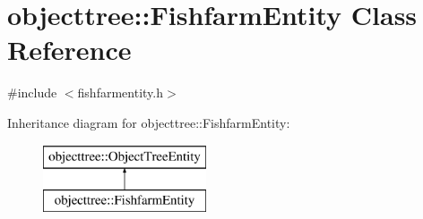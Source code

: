 \hypertarget{classobjecttree_1_1_fishfarm_entity}{}\section{objecttree\+::Fishfarm\+Entity Class Reference}
\label{classobjecttree_1_1_fishfarm_entity}


{\ttfamily \#include $<$fishfarmentity.\+h$>$}

Inheritance diagram for objecttree\+::Fishfarm\+Entity\+:\begin{figure}[H]
\begin{center}
\leavevmode
\includegraphics[height=2.000000cm]{d0/dd9/classobjecttree_1_1_fishfarm_entity}
\end{center}
\end{figure}
